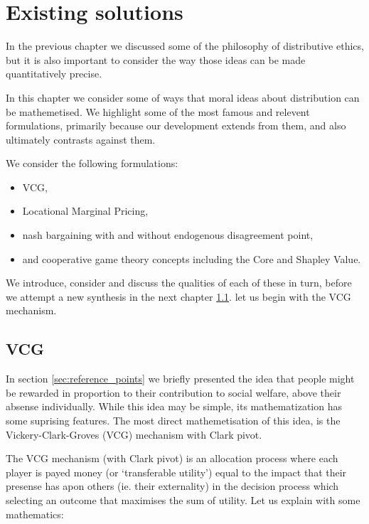 \chapter{Existing solutions}
\label{cha:solutions}

In the previous chapter we discussed some of the philosophy of distributive ethics, but it is also important to consider the way those ideas can be made quantitatively precise.

In this chapter we consider some of ways that moral ideas about distribution can be mathemetised.
We highlight some of the most famous and relevent formulations, primarily because our development extends from them, and also ultimately contrasts against them.

We consider the following formulations:
\begin{itemize}
\item VCG,
\item Locational Marginal Pricing,
\item nash bargaining with and without endogenous disagreement point,
\item and cooperative game theory concepts including the Core and Shapley Value.
\end{itemize}

We introduce, consider and discuss the qualities of each of these in turn, before we attempt a new synthesis in the next chapter \ref{}.
let us begin with the VCG mechanism.

\section{VCG}

In section \ref{sec:reference_points} we briefly presented the idea that people might be rewarded in proportion to their contribution to social welfare, above their absense individually.
While this idea may be simple, its mathematization has some suprising features.
The most direct mathemetisation of this idea, is the Vickery-Clark-Groves (VCG) mechanism with Clark pivot.

The VCG mechanism (with Clark pivot) is an allocation process where each player is payed money (or `transferable utility') equal to the impact that their presense has apon others (ie. their externality) in the decision process which selecting an outcome that maximises the sum of utility.
Let us explain with some mathematics:

